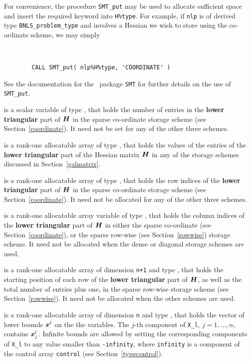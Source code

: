 \documentclass{galahad}
\newcommand{\packagename}{BNLS}
\begin{document}
\begin{description}
\begin{description}
For convenience, the procedure {\tt SMT\_put}
may be used to allocate sufficient space and insert the required keyword
into {\tt H\%type}.
For example, if {\tt nlp} is of derived type {\tt \packagename\_problem\_type}
and involves a Hessian we wish to store using the co-ordinate scheme,
we may simply
{\tt
\begin{verbatim}
        CALL SMT_put( nlp%H%type, 'COORDINATE' )
\end{verbatim}
}
\noindent
See the documentation for the \galahad\ package {\tt SMT}
for further details on the use of {\tt SMT\_put}.

 is a scalar variable of type \integer, that
holds the number of entries in the {\bf lower triangular} part of ${\bm{H}}$
in the sparse co-ordinate storage scheme (see Section~\ref{coordinate}).
It need not be set for any of the other three schemes.

 is a rank-one allocatable array of type \realdp, that holds
the values of the entries of the {\bf lower triangular} part
of the Hessian matrix ${\bm{H}}$ in any of the
storage schemes discussed in Section~\ref{galmatrix}.

 is a rank-one allocatable array of type \integer,
that holds the row indices of the {\bf lower triangular} part of ${\bm{H}}$
in the sparse co-ordinate storage
scheme (see Section~\ref{coordinate}).
It need not be allocated for any of the other three schemes.

 is a rank-one allocatable array variable of type \integer,
that holds the column indices of the {\bf lower triangular} part of
${\bm{H}}$ in either the sparse co-ordinate
(see Section~\ref{coordinate}), or the sparse row-wise
(see Section~\ref{rowwise}) storage scheme.
It need not be allocated when the dense or diagonal storage schemes are used.

 is a rank-one allocatable array of dimension {\tt n+1} and type
\integer, that holds the starting position of
each row of the {\bf lower triangular} part of ${\bm{H}}$, as well
as the total number of entries plus one, in the sparse row-wise storage
scheme (see Section~\ref{rowwise}). It need not be allocated when the
other schemes are used.

\end{description}

 is a rank-one allocatable array of dimension {\tt n} and type
\realdp, that holds
the vector of lower bounds ${\bm{x}}^{l}$ on the the variables.
The $j$-th component of {\tt X\_l}, $j = 1, \ldots , n$,
contains ${\bm{x}}_{j}^{l}$.
Infinite bounds are allowed by setting the corresponding
components of {\tt X\_l} to any value smaller than {\tt -infinity},
where {\tt infinity} is a component of the control array {\tt control}
(see Section~\ref{typecontrol}).


\end{description}
\end{document}
